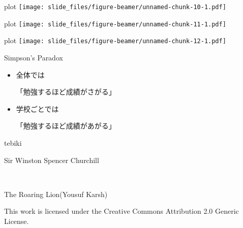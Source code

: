 \documentclass[
  ignorenonframetext,
]{beamer}
\providecommand{\tightlist}{%
  \setlength{\itemsep}{0pt}\setlength{\parskip}{0pt}}
\begin{document}
\begin{frame}{plot}
\protect\hypertarget{plot-5}{}
\texttt{[image: slide\_files/figure-beamer/unnamed-chunk-10-1.pdf]}
\end{frame}

\begin{frame}{plot}
\protect\hypertarget{plot-6}{}
\texttt{[image: slide\_files/figure-beamer/unnamed-chunk-11-1.pdf]}
\end{frame}

\begin{frame}{plot}
\protect\hypertarget{plot-7}{}
\texttt{[image: slide\_files/figure-beamer/unnamed-chunk-12-1.pdf]}
\end{frame}

\begin{frame}{Simpson's Paradox}
\protect\hypertarget{simpsons-paradox}{}
\LARGE

\begin{itemize}[<+->]
\tightlist
\item
  \textbullet{}\hspace{2pt}全体では

  \par

  「勉強するほど成績がさがる」 \bigskip
\item
  \textbullet{}\hspace{2pt}学校ごとでは

  \par

  「勉強するほど成績があがる」
\end{itemize}

\normalsize
\end{frame}

\begin{frame}{tebiki}
\protect\hypertarget{tebiki}{}
\vspace*{-20pt}
\end{frame}

\begin{frame}{Sir Winston Spencer Churchill}
\protect\hypertarget{sir-winston-spencer-churchill}{}
\raggedleft\Huge


\tiny

\raggedleft

The Roaring Lion(Yousuf Karsh) \vspace{-5pt}

This work is licensed under the Creative Commons Attribution 2.0 Generic
License.
\end{frame}
\end{document}
